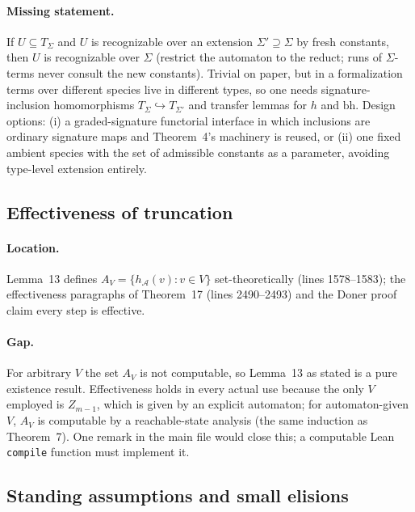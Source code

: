 \documentclass[11pt]{article}
\newcommand{\Term}[1]{T_{#1}}
\newcommand{\Aut}{\mathcal A}
\newcommand{\bh}{\mathrm{bh}}
\begin{document}
\paragraph{Missing statement.} If \(U\subseteq\Term{\Sigma}\) and \(U\) is
recognizable over an extension \(\Sigma'\supseteq\Sigma\) by fresh constants,
then \(U\) is recognizable over \(\Sigma\) (restrict the automaton to the
reduct; runs of \(\Sigma\)-terms never consult the new constants).  Trivial on
paper, but in a formalization terms over different species live in different
types, so one needs signature-inclusion homomorphisms
\(\Term{\Sigma}\hookrightarrow\Term{\Sigma'}\) and transfer lemmas for \(h\)
and \(\bh\).  Design options: (i) a graded-signature functorial interface in
which inclusions are ordinary signature maps and Theorem~4's machinery is
reused, or (ii) one fixed ambient species with the set of admissible constants
as a parameter, avoiding type-level extension entirely.

\subsection{Effectiveness of truncation}

\paragraph{Location.} Lemma~13 defines \(A_V=\{h_\Aut(v):v\in V\}\)
set-theoretically (lines 1578--1583); the effectiveness paragraphs of
Theorem~17 (lines 2490--2493) and the Doner proof claim every step is
effective.

\paragraph{Gap.} For arbitrary \(V\) the set \(A_V\) is not computable, so
Lemma~13 as stated is a pure existence result.  Effectiveness holds in every
actual use because the only \(V\) employed is \(Z_{m-1}\), which is given by an
explicit automaton; for automaton-given \(V\), \(A_V\) is computable by a
reachable-state analysis (the same induction as Theorem~7).  One remark in the
main file would close this; a computable Lean \texttt{compile} function must
implement it.

\subsection{Standing assumptions and small elisions}
\end{document}
